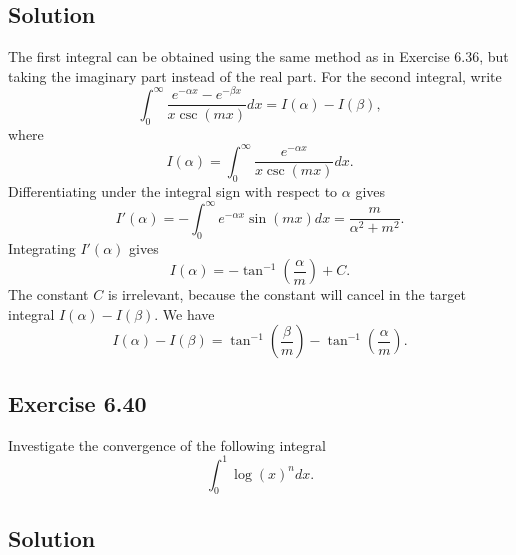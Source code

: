 \subsection*{Solution}

The first integral can be obtained using the same method as in Exercise 6.36, but taking the imaginary part instead of the real part.
For the second integral, write
\begin{equation*}
    \int_0^{\infty} \frac{e^{-\alpha x} - e^{-\beta x}}{x \csc(mx)} dx = I(\alpha) - I(\beta),
\end{equation*}
where
\begin{equation*}
    I(\alpha) = \int_0^{\infty} \frac{e^{-\alpha x}}{x \csc(mx)} dx.
\end{equation*}
Differentiating under the integral sign with respect to $\alpha$ gives
\begin{equation*}
    I'(\alpha) = - \int_0^{\infty} e^{-\alpha x} \sin(mx) dx = \frac{m}{\alpha^2 + m^2}.
\end{equation*}
Integrating $I'(\alpha)$ gives
\begin{equation*}
    I(\alpha) = -\tan^{-1}\left( \frac{\alpha}{m} \right) + C.
\end{equation*}
The constant $C$ is irrelevant, because the constant will cancel in the target integral $I(\alpha) - I(\beta)$.
We have
\begin{equation*}
    I(\alpha) - I(\beta) = \tan^{-1}\left(\frac{\beta}{m}\right) - \tan^{-1}\left(\frac{\alpha}{m}\right).
\end{equation*}


\subsection*{Exercise 6.40}

Investigate the convergence of the following integral
\begin{equation*}
    \int_0^1 \log(x)^n dx.
\end{equation*}

\subsection*{Solution}

